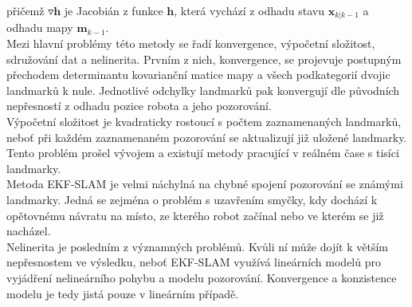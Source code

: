 \documentclass[12pt]{article}
\begin{document}
přičemž $\triangledown\textbf{h}$ je Jacobián z funkce $\textbf{h}$, která vychází z odhadu stavu $\textbf{\^{x}}_{k|k-1}$ a odhadu mapy $\textbf{\^{m}}_{k-1}$.\\
\indent Mezi hlavní problémy této metody se řadí konvergence, výpočetní složitost, sdružování dat a nelinerita. Prvním z nich, konvergence, se projevuje postupným přechodem determinantu kovarianční matice mapy a všech podkategorií dvojic landmarků k nule. Jednotlivé odchylky landmarků pak konvergují dle původních nepřesností z odhadu pozice robota a jeho pozorování.\\
\indent Výpočetní složitost je kvadraticky rostoucí s počtem zaznamenaných landmarků, neboť při každém zaznamenaném pozorování se aktualizují již uložené landmarky. Tento problém prošel vývojem a existují metody pracující v reálném čase s tisíci landmarky.\\
\indent Metoda EKF-SLAM je velmi náchylná na chybné spojení pozorování se známými landmarky. Jedná se zejména o problém s uzavřením smyčky, kdy dochází k opětovnému návratu na místo, ze kterého robot začínal nebo ve kterém se již nacházel.\\
\indent Nelinerita je posledním z významných problémů. Kvůli ní může dojít k větším nepřesnostem ve výsledku, neboť EKF-SLAM využívá lineárních modelů pro vyjádření nelineárního pohybu a modelu pozorování. Konvergence a konzistence modelu je tedy jistá pouze v lineárním případě. 
\end{document}
